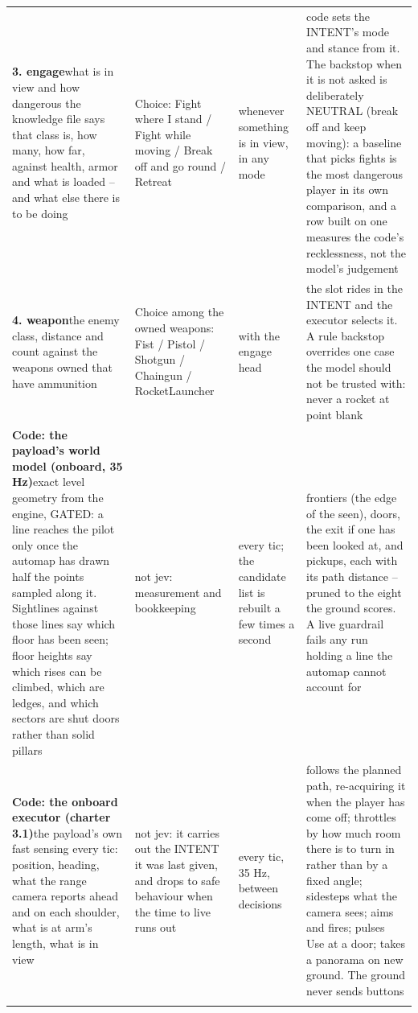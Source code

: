 \begin{longtable}{L{0.27\textwidth} L{0.21\textwidth} L{0.11\textwidth} L{0.29\textwidth}}
\textbf{3. engage}\newline what is in view and how dangerous the knowledge file says that class is, how many, how far, against health, armor and what is loaded -- and what else there is to be doing & Choice: Fight where I stand / Fight while moving / Break off and go round / Retreat & whenever something is in view, in any mode & code sets the INTENT's mode and stance from it. The backstop when it is not asked is deliberately NEUTRAL (break off and keep moving): a baseline that picks fights is the most dangerous player in its own comparison, and a row built on one measures the code's recklessness, not the model's judgement \\ \rowrule
\textbf{4. weapon}\newline the enemy class, distance and count against the weapons owned that have ammunition & Choice among the owned weapons: Fist / Pistol / Shotgun / Chaingun / RocketLauncher & with the engage head & the slot rides in the INTENT and the executor selects it. A rule backstop overrides one case the model should not be trusted with: never a rocket at point blank \\ \rowrule
\textbf{Code: the payload's world model (onboard, 35 Hz)}\newline exact level geometry from the engine, GATED: a line reaches the pilot only once the automap has drawn half the points sampled along it. Sightlines against those lines say which floor has been seen; floor heights say which rises can be climbed, which are ledges, and which sectors are shut doors rather than solid pillars & not jev: measurement and bookkeeping & every tic; the candidate list is rebuilt a few times a second & frontiers (the edge of the seen), doors, the exit if one has been looked at, and pickups, each with its path distance -- pruned to the eight the ground scores. A live guardrail fails any run holding a line the automap cannot account for \\ \rowrule
\textbf{Code: the onboard executor (charter 3.1)}\newline the payload's own fast sensing every tic: position, heading, what the range camera reports ahead and on each shoulder, what is at arm's length, what is in view & not jev: it carries out the INTENT it was last given, and drops to safe behaviour when the time to live runs out & every tic, 35 Hz, between decisions & follows the planned path, re-acquiring it when the player has come off; throttles by how much room there is to turn in rather than by a fixed angle; sidesteps what the camera sees; aims and fires; pulses Use at a door; takes a panorama on new ground. The ground never sends buttons \\ \rowrule

\end{longtable}

